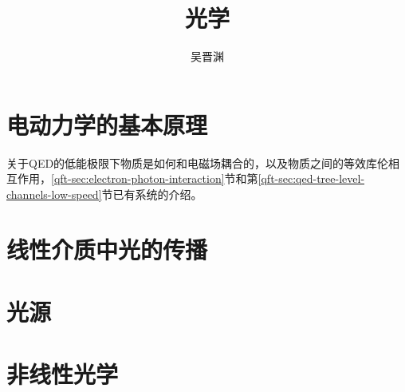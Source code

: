 \documentclass[UTF8, a4paper]{ctexbook}
\title{光学}
\author{吴晋渊}
\numberwithin{equation}{chapter}
\newcommand{\qftdoc}{\href{../relativistic-qft/relativistic-qft.pdf}{相对论性量子场论笔记}}
\begin{document}
\maketitle

\part{电动力学的基本原理}

关于QED的低能极限下物质是如何和电磁场耦合的，以及物质之间的等效库伦相互作用，\ref{qft-sec:electron-photon-interaction}节和第\ref{qft-sec:qed-tree-level-channels-low-speed}节已有系统的介绍。



\part{线性介质中光的传播}







\part{光源}\label{part:source}



\part{非线性光学}








 
\end{document}
